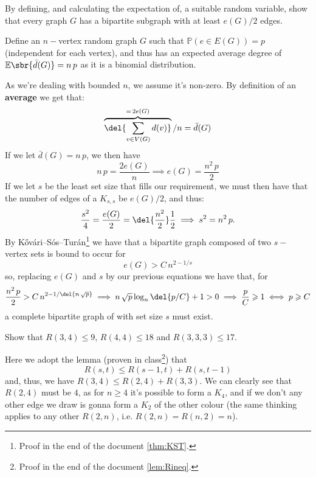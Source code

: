 \documentclass[english]{IMTexam}
\author{Isabella B. Amaral}
\begin{document}
	
	\maketitle
	
	\begin{questions}
		\question By defining, and calculating the expectation of, a suitable random variable, show that every graph $ G $ has a bipartite subgraph with at least $ e(G)/2 $ edges.
		
		\begin{solution}
			Define an $ n- $vertex random graph $ G $ such that $ \mathbb{P}(e\in E(G))=p $ (independent for each vertex), and thus has an expected average degree of $ \mathbb{E}\sbr{\bar{d}(G)}=n\,p $ as it is a binomial distribution.
			
			As we're dealing with bounded $ n $, we assume it's non-zero. By definition of an \textbf{average} we get that:
			\[ \overbrace{\del{\displaystyle\sum_{v\in V(G)}d(v)}}^{=\,2e(G)}/n=\bar{d}(G) \]
			If we let $ \bar{d}(G)=n\,p $, we then have
			\[ n\,p=\dfrac{2e(G)}{n}\implies e(G)=\dfrac{n^{2}\,p}{2} \]
			If we let $ s $ be the least set size that fills our requirement, we must then have that the number of edges of a $ K_{s,s} $ be $ e(G)/2 $, and thus:
			\[ \dfrac{s^{2}}{4}=\dfrac{e(G)}{2}=\del{\dfrac{n^{2}}{2}}\dfrac{1}{2}\implies s^{2}=n^{2}\,p. \]
			By Kővári--Sós--Turán\footnote{Proof in the end of the document \ref{thm:KST}.} we have that a bipartite graph composed of two $ s- $vertex sets is bound to occur for
			\[ e(G)>C\,n^{2-1/s} \]
			so, replacing $ e(G) $ and $ s $ by our previous equations we have that, for
			\[ \dfrac{n^{2}\,p}{2}>C\,n^{2-1/\del{n\,\sqrt{p}}}\implies n\,\sqrt{p}\log_{n}\del{p/C}+1>0\implies \dfrac{p}{C}\geqslant 1\iff p \geqslant C \]
			a complete bipartite graph of with set size $ s $ must exist.
			
		\end{solution}
		
		\question Show that $ R(3,4)\leqslant 9 $, $ R(4,4) \leqslant 18 $ and $  R(3, 3, 3) \leqslant 17 $.
		
		\begin{solution}
			Here we adopt the lemma (proven in class\footnote{Proof in the end of the document \ref{lem:Rineq}.}) that
			\[ R(s,t)\leqslant R(s-1,t)+R(s,t-1) \]
			and, thus, we have $ R(3,4)\leqslant R(2,4)+R(3,3) $. We can clearly see that $ R(2,4) $ must be $ 4 $, as for $ n\geqslant 4 $ it's possible to form a $ K_4 $, and if we don't any other edge we draw is gonna form a $ K_2 $ of the other colour (the same thinking applies to any other $ R(2,n) $, i.e. $ R(2,n)=R(n,2)=n $).
			

\end{solution}
\end{questions}
\end{document}
